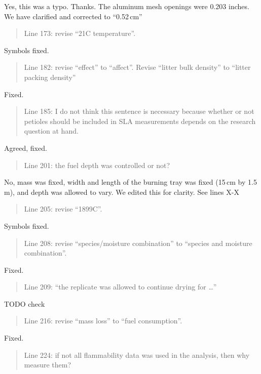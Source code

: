 \documentclass[letterpaper, 12pt]{letter}
\begin{document}
\begin{letter}{}
Yes, this was a typo. Thanks. The aluminum mesh openings were 0.203 inches. We have clarified and corrected to ``0.52\,cm'' 

\begin{quote}
Line 173: revise “21C temperature”.
\end{quote}

Symbols fixed.

\begin{quote}
Line 182: revise “effect” to “affect”. 	Revise “litter bulk density” to “litter packing density”
\end{quote}

Fixed.

\begin{quote}
Line 185: I do not think this sentence is necessary because whether or not petioles should be included in SLA measurements depends on the research question at hand.
\end{quote}

Agreed, fixed.

\begin{quote}
Line 201: the fuel depth was controlled or not?
\end{quote}

No, mass was fixed, width and length of the burning tray was fixed (15\,cm by 1.5\,m), and depth was allowed to vary.  We edited this for clarity. See lines X-X

\begin{quote}
Line 205: revise “1899C”.
\end{quote}


Symbols fixed.

\begin{quote}
Line 208: revise “species/moisture combination” to “species and moisture combination”.
\end{quote}

Fixed.

\begin{quote}
Line 209: “the replicate was allowed to continue drying for …”
\end{quote}

TODO check

\begin{quote}
Line 216: revise “mass loss” to “fuel consumption”.
\end{quote}

Fixed.

\begin{quote}
Line 224: if not all flammability data was used in the analysis, then why measure them?
\end{quote}


\end{letter}
\end{document}
